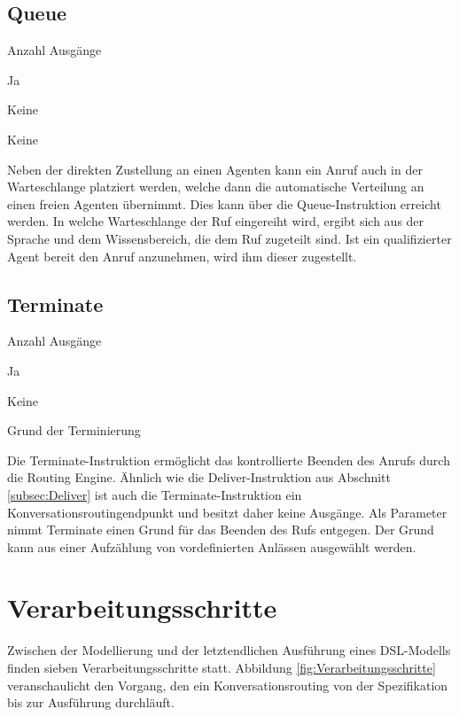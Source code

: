 \subsection{Queue}
\label{subsec:Queue}
\begin{labeling}{Anzahl Ausgänge}
\item [Eingang] Ja
\item [Anzahl Ausgänge] Keine
\item [Parameter] Keine
\item [Beschreibung] Neben der direkten Zustellung an einen Agenten kann ein Anruf auch in der Warteschlange platziert werden, welche dann die automatische Verteilung an einen freien Agenten übernimmt. Dies kann über die Queue-Instruktion erreicht werden. In welche Warteschlange der Ruf eingereiht wird, ergibt sich aus der Sprache und dem Wissensbereich, die dem Ruf zugeteilt sind. Ist ein qualifizierter Agent bereit den Anruf anzunehmen, wird ihm dieser zugestellt.
\end{labeling}


\subsection{Terminate}
\label{subsec:terminate}
\begin{labeling}{Anzahl Ausgänge}
\item [Eingang] Ja
\item [Anzahl Ausgänge] Keine
\item [Parameter] Grund der Terminierung
\item [Beschreibung] Die Terminate-Instruktion ermöglicht das kontrollierte Beenden des Anrufs durch die Routing Engine. Ähnlich wie die Deliver-Instruktion aus Abschnitt \ref{subsec:Deliver} ist auch die Terminate-Instruktion ein Konversationsroutingendpunkt und besitzt daher keine Ausgänge. Als Parameter nimmt Terminate einen Grund für das Beenden des Rufs entgegen. Der Grund kann aus einer Aufzählung von vordefinierten Anlässen ausgewählt werden.
\end{labeling}


\section{Verarbeitungsschritte}
\label{sec:Verarbeitungsschritte}
Zwischen der Modellierung und der letztendlichen Ausführung eines DSL-Modells finden sieben Verarbeitungsschritte statt. Abbildung \ref{fig:Verarbeitungsschritte} veranschaulicht den Vorgang, den ein Konversationsrouting von der Spezifikation bis zur Ausführung durchläuft.

